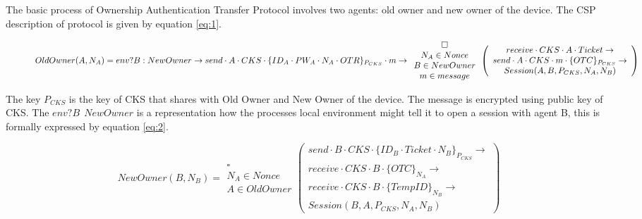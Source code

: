\documentclass[letterpaper]{article}
\begin{document}
The basic process of Ownership Authentication Transfer Protocol involves two agents: old owner and new owner of the device. The CSP description of protocol is given by equation \eqref{eq:1}.
\begin{figure*}[bpht!]
\begin{dmath}\label{eq:1}
OldOwner(A,N_{A})=env?B:NewOwner \rightarrow send \cdot A \cdot CKS \cdot \{ID_{A}\cdot PW_{A} \cdot N_{A} \cdot OTR\}_{P_{CKS}} \cdot m \rightarrow \\
\begin{array}{c} \square \\N_{A} \in Nonce \\ B \in NewOwner \\ m \in  message \end{array} \left(\begin{array}{c} receive \cdot CKS \cdot A \cdot Ticket \rightarrow \\ send \cdot A \cdot CKS \cdot m \cdot \{OTC\}_{P_{CKS}} \rightarrow \\ 
Session(A,B,P_{CKS},N_{A},N_{B})\end{array} \right)
\end{dmath}
\end{figure*}

The key $P_{CKS}$ is the key of CKS that shares with Old Owner and New Owner of the device. The message is encrypted using public key of CKS. The $env?B\:\ NewOwner$ is a representation how the processes local environment might tell it to open a session with agent B, this is formally expressed by equation \eqref{eq:2}.
\begin{figure*}[bpht!]
\begin{dmath}\label{eq:2}
NewOwner(B,N_{B})= \begin{array}{c} \square \\N_{A}\in Nonce \\ A \in OldOwner \end{array} \left(\begin{array}{c} send \cdot B \cdot CKS \cdot \{ID_{B} \cdot Ticket \cdot N_{B}\}_{P_{CKS}}     \rightarrow \\ receive \cdot CKS \cdot B \cdot \{OTC\}_{N_{A}} \rightarrow \\
receive\cdot CKS \cdot B \cdot  \{TempID\}_{N_{B}} \rightarrow \\ 
Session(B,A,P_{CKS},N_{A},N_{B})\end{array} \right)
\end{dmath}
\end{figure*}
\end{document}
